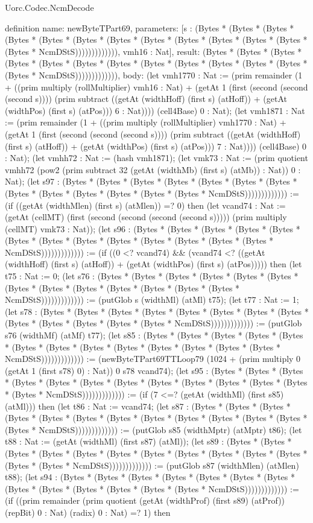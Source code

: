 \begin{lexlean}{Uorc.Codec.NcmDecode}
\begin{semanticmodule}
definition{
  name: newByteTPart69,
  parameters: [s : (Bytes * (Bytes * (Bytes * (Bytes * (Bytes * (Bytes * (Bytes * (Bytes * (Bytes * (Bytes * (Bytes * (Bytes * (Bytes * NcmDStS))))))))))))), vmh16 : Nat],
  result: (Bytes * (Bytes * (Bytes * (Bytes * (Bytes * (Bytes * (Bytes * (Bytes * (Bytes * (Bytes * (Bytes * (Bytes * (Bytes * NcmDStS))))))))))))),
  body: (let vmh1770 : Nat := (prim remainder (1 + ((prim multiply (rollMultiplier) vmh16 : Nat) + (getAt 1 (first (second (second (second s)))) (prim subtract ((getAt (widthHoff) (first s) (atHoff)) + (getAt (widthPos) (first s) (atPos))) 6 : Nat)))) (cell4Base) 0 : Nat); (let vmh1871 : Nat := (prim remainder (1 + ((prim multiply (rollMultiplier) vmh1770 : Nat) + (getAt 1 (first (second (second (second s)))) (prim subtract ((getAt (widthHoff) (first s) (atHoff)) + (getAt (widthPos) (first s) (atPos))) 7 : Nat)))) (cell4Base) 0 : Nat); (let vmhh72 : Nat := (hash vmh1871); (let vmk73 : Nat := (prim quotient vmhh72 (pow2 (prim subtract 32 (getAt (widthMb) (first s) (atMb)) : Nat)) 0 : Nat); (let s97 : (Bytes * (Bytes * (Bytes * (Bytes * (Bytes * (Bytes * (Bytes * (Bytes * (Bytes * (Bytes * (Bytes * (Bytes * (Bytes * NcmDStS))))))))))))) := (if ((getAt (widthMlen) (first s) (atMlen)) =? 0) then (let vcand74 : Nat := (getAt (cellMT) (first (second (second (second (second s))))) (prim multiply (cellMT) vmk73 : Nat)); (let s96 : (Bytes * (Bytes * (Bytes * (Bytes * (Bytes * (Bytes * (Bytes * (Bytes * (Bytes * (Bytes * (Bytes * (Bytes * (Bytes * NcmDStS))))))))))))) := (if ((0 <? vcand74) && (vcand74 <? ((getAt (widthHoff) (first s) (atHoff)) + (getAt (widthPos) (first s) (atPos))))) then (let t75 : Nat := 0; (let s76 : (Bytes * (Bytes * (Bytes * (Bytes * (Bytes * (Bytes * (Bytes * (Bytes * (Bytes * (Bytes * (Bytes * (Bytes * (Bytes * NcmDStS))))))))))))) := (putGlob s (widthMl) (atMl) t75); (let t77 : Nat := 1; (let s78 : (Bytes * (Bytes * (Bytes * (Bytes * (Bytes * (Bytes * (Bytes * (Bytes * (Bytes * (Bytes * (Bytes * (Bytes * (Bytes * NcmDStS))))))))))))) := (putGlob s76 (widthMf) (atMf) t77); (let s85 : (Bytes * (Bytes * (Bytes * (Bytes * (Bytes * (Bytes * (Bytes * (Bytes * (Bytes * (Bytes * (Bytes * (Bytes * (Bytes * NcmDStS))))))))))))) := (newByteTPart69TTLoop79 (1024 + (prim multiply 0 (getAt 1 (first s78) 0) : Nat)) 0 s78 vcand74); (let s95 : (Bytes * (Bytes * (Bytes * (Bytes * (Bytes * (Bytes * (Bytes * (Bytes * (Bytes * (Bytes * (Bytes * (Bytes * (Bytes * NcmDStS))))))))))))) := (if (7 <=? (getAt (widthMl) (first s85) (atMl))) then (let t86 : Nat := vcand74; (let s87 : (Bytes * (Bytes * (Bytes * (Bytes * (Bytes * (Bytes * (Bytes * (Bytes * (Bytes * (Bytes * (Bytes * (Bytes * (Bytes * NcmDStS))))))))))))) := (putGlob s85 (widthMptr) (atMptr) t86); (let t88 : Nat := (getAt (widthMl) (first s87) (atMl)); (let s89 : (Bytes * (Bytes * (Bytes * (Bytes * (Bytes * (Bytes * (Bytes * (Bytes * (Bytes * (Bytes * (Bytes * (Bytes * (Bytes * NcmDStS))))))))))))) := (putGlob s87 (widthMlen) (atMlen) t88); (let s94 : (Bytes * (Bytes * (Bytes * (Bytes * (Bytes * (Bytes * (Bytes * (Bytes * (Bytes * (Bytes * (Bytes * (Bytes * (Bytes * NcmDStS))))))))))))) := (if ((prim remainder (prim quotient (getAt (widthProf) (first s89) (atProf)) (repBit) 0 : Nat) (radix) 0 : Nat) =? 1) then }
\end{semanticmodule}
\end{lexlean}
